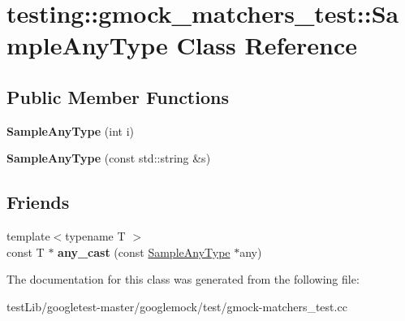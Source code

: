 \hypertarget{classtesting_1_1gmock__matchers__test_1_1SampleAnyType}{}\section{testing\+:\+:gmock\+\_\+matchers\+\_\+test\+:\+:Sample\+Any\+Type Class Reference}
\label{classtesting_1_1gmock__matchers__test_1_1SampleAnyType}
\subsection*{Public Member Functions}
\begin{DoxyCompactItemize}
\item 
\mbox{\label{classtesting_1_1gmock__matchers__test_1_1SampleAnyType_a8f77e083452210341cb9552fccb4aeab}} 
{\bfseries Sample\+Any\+Type} (int i)
\item 
\mbox{\label{classtesting_1_1gmock__matchers__test_1_1SampleAnyType_a1a9abd19e3f7ca8bc78c05fc5ee2299e}} 
{\bfseries Sample\+Any\+Type} (const std\+::string \&s)
\end{DoxyCompactItemize}
\subsection*{Friends}
\begin{DoxyCompactItemize}
\item 
\mbox{\label{classtesting_1_1gmock__matchers__test_1_1SampleAnyType_a5f0f90347eeb986f111c81e6592a74e6}} 
{\footnotesize template$<$typename T $>$ }\\const T $\ast$ {\bfseries any\+\_\+cast} (const \hyperlink{classtesting_1_1gmock__matchers__test_1_1SampleAnyType}{Sample\+Any\+Type} $\ast$any)
\end{DoxyCompactItemize}


The documentation for this class was generated from the following file\+:\begin{DoxyCompactItemize}
\item 
test\+Lib/googletest-\/master/googlemock/test/gmock-\/matchers\+\_\+test.\+cc\end{DoxyCompactItemize}

